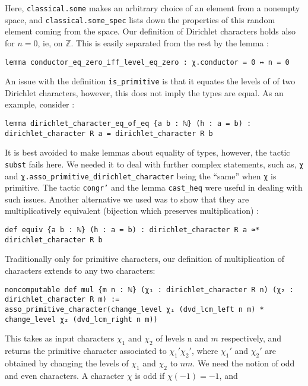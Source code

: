 \documentclass[a4paper,UKenglish,cleveref, autoref, thm-restate]{lipics-v2021}
\newcommand{\lean}[1]{\texttt{#1}\xspace} %
\begin{document}
Here, \lean{classical.some} makes an arbitrary choice of an element from a nonempty space, and \lean{classical.some\_spec} lists down the properties of this random element
coming from the space. 
Our definition of Dirichlet characters holds also for $n = 0$, ie, on $\mathbb{Z}$. 
This is easily separated from the rest by the lemma : 
\begin{lstlisting}
lemma conductor_eq_zero_iff_level_eq_zero : χ.conductor = 0 ↔ n = 0
\end{lstlisting}
An issue with the definition \lean{is\_primitive} is that it equates the levels of of two Dirichlet characters, 
however, this does not imply the types are equal. As an example, consider :
\begin{lstlisting}
lemma dirichlet_character_eq_of_eq {a b : ℕ} (h : a = b) :
dirichlet_character R a = dirichlet_character R b
\end{lstlisting}
It is best avoided to make lemmas about equality of types, however, the tactic \lean{subst} fails here. 
We needed it to deal with further complex statements, such as, \lean{χ} and \lean{χ.asso\_primitive\_dirichlet\_character} 
being the ``same'' when \lean{χ} is primitive. The tactic \lean{congr'} and the lemma \lean{cast\_heq} were useful in 
dealing with such issues. Another alternative we used was to show that they are multiplicatively equivalent 
(bijection which preserves multiplication) : 
\begin{lstlisting}
def equiv {a b : ℕ} (h : a = b) : dirichlet_character R a ≃* dirichlet_character R b
\end{lstlisting}
Traditionally only for primitive characters, our definition of multiplication of characters 
extends to any two characters: 
\begin{lstlisting}
noncomputable def mul {m n : ℕ} (χ₁ : dirichlet_character R n) (χ₂ : dirichlet_character R m) :=
asso_primitive_character(change_level χ₁ (dvd_lcm_left n m) * change_level χ₂ (dvd_lcm_right n m))
\end{lstlisting}
This takes as input characters $\chi_1$ and $\chi_2$ of levels n and $m$ respectively, and returns the primitive 
character associated to $\chi_1' \chi_2'$, where $\chi_1'$ and $\chi_2'$ are obtained by changing the levels 
of $\chi_1$ and $\chi_2$ to $n m$. 
\newline
We need the notion of odd and even characters. A character $\chi$ is odd if $\chi (-1) = -1$, and 
\end{document}
